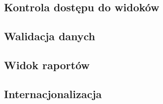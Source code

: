 

\subsection{Kontrola dostępu do widoków}




\subsection{Walidacja danych}




\subsection{Widok raportów}




\subsection{Internacjonalizacja}
